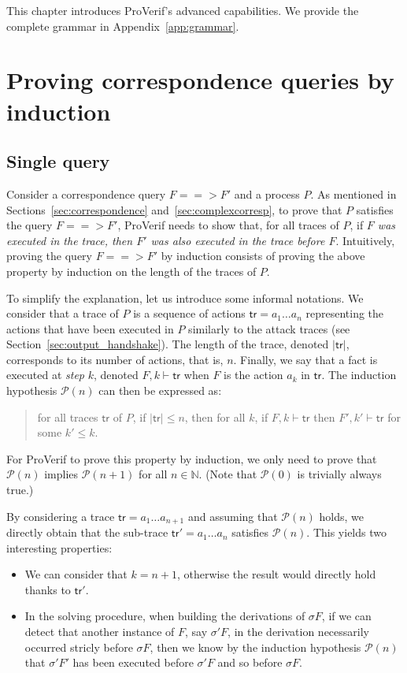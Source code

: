 \documentclass{book}
\begin{document}
This chapter introduces ProVerif's advanced capabilities. We provide the complete
grammar in Appendix~\ref{app:grammar}.

\section{Proving correspondence queries by induction}\label{sec:induction}

\subsection{Single query}

Consider a correspondence query $F ==> F'$ and a process $P$. As mentioned in Sections~\ref{sec:correspondence} and~\ref{sec:complexcorresp}, to prove that $P$ satisfies the query $F ==> F'$, ProVerif needs to show that, for all traces of $P$, if \emph{$F$ was executed in the trace, then $F'$ was also executed in the trace before $F$}. Intuitively, proving the query $F ==> F'$ by induction consists of proving the above property by induction on the length of the traces of $P$.

To simplify the explanation, let us introduce some informal notations. We consider that a trace of $P$ is a sequence of actions $\mathsf{tr} = a_1 \ldots a_n$ representing the actions that have been executed in $P$ similarly to the attack traces (see Section~\ref{sec:output_handshake}). The length of the trace, denoted $|\mathsf{tr}|$, corresponds to its number of actions, that is, $n$. Finally, we say that a fact is executed at \emph{step} $k$, denoted $F,k \vdash \mathsf{tr}$ when $F$ is the action $a_k$ in $\mathsf{tr}$. The induction hypothesis $\mathcal{P}(n)$ can then be expressed as:
\begin{quote}
for all traces $\mathsf{tr}$ of $P$, if $|\mathsf{tr}| \leq n$, then for all $k$, if $F,k \vdash \mathsf{tr}$ then $F',k' \vdash \mathsf{tr}$ for some $k' \leq k$.
\end{quote}
For ProVerif to prove this property by induction, we only need to prove that $\mathcal{P}(n)$ implies $\mathcal{P}(n+1)$ for all $n \in \mathbb{N}$. (Note that $\mathcal{P}(0)$ is trivially always true.)

By considering a trace $\mathsf{tr} = a_1 \ldots a_{n+1}$ and assuming that $\mathcal{P}(n)$ holds, we directly obtain that the sub-trace $\mathsf{tr'} = a_1 \ldots a_n$ satisfies $\mathcal{P}(n)$. This yields two interesting properties:
\begin{itemize}
	\item We can consider that $k = n+1$, otherwise the result would directly hold thanks to $\mathsf{tr'}$.
	\item In the solving procedure, when building the derivations of $\sigma F$, if we can detect that another instance of $F$, say $\sigma' F$, in the derivation necessarily occurred stricly before $\sigma F$, then we know by the induction hypothesis $\mathcal{P}(n)$ that $\sigma' F'$ has been executed before $\sigma' F$ and so before $\sigma F$.
\end{itemize}
\end{document}
